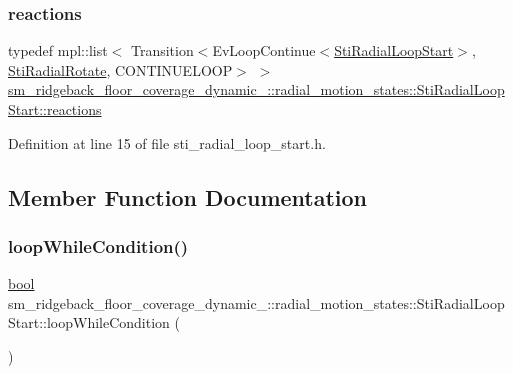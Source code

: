 \subsubsection{\texorpdfstring{reactions}{reactions}}
{\footnotesize\ttfamily typedef mpl\+::list$<$ Transition$<$Ev\+Loop\+Continue$<$\hyperlink{structsm__ridgeback__floor__coverage__dynamic__1_1_1radial__motion__states_1_1StiRadialLoopStart}{Sti\+Radial\+Loop\+Start}$>$, \hyperlink{structsm__ridgeback__floor__coverage__dynamic__1_1_1radial__motion__states_1_1StiRadialRotate}{Sti\+Radial\+Rotate}, C\+O\+N\+T\+I\+N\+U\+E\+L\+O\+OP$>$ $>$ \hyperlink{structsm__ridgeback__floor__coverage__dynamic__1_1_1radial__motion__states_1_1StiRadialLoopStart_addf4a71b8b7c86e0e764850cdeb252e7}{sm\+\_\+ridgeback\+\_\+floor\+\_\+coverage\+\_\+dynamic\+\_\+::radial\+\_\+motion\+\_\+states\+::\+Sti\+Radial\+Loop\+Start\+::reactions}}



Definition at line 15 of file sti\+\_\+radial\+\_\+loop\+\_\+start.\+h.



\subsection{Member Function Documentation}
\mbox{\label{structsm__ridgeback__floor__coverage__dynamic__1_1_1radial__motion__states_1_1StiRadialLoopStart_a4181a010973c9b49105b65d73805ccd2}} 
\subsubsection{\texorpdfstring{loop\+While\+Condition()}{loopWhileCondition()}}
{\footnotesize\ttfamily \hyperlink{classbool}{bool} sm\+\_\+ridgeback\+\_\+floor\+\_\+coverage\+\_\+dynamic\+\_\+::radial\+\_\+motion\+\_\+states\+::\+Sti\+Radial\+Loop\+Start\+::loop\+While\+Condition (\begin{DoxyParamCaption}{ }\end{DoxyParamCaption})\hspace{0.3cm}{\ttfamily [inline]}}



